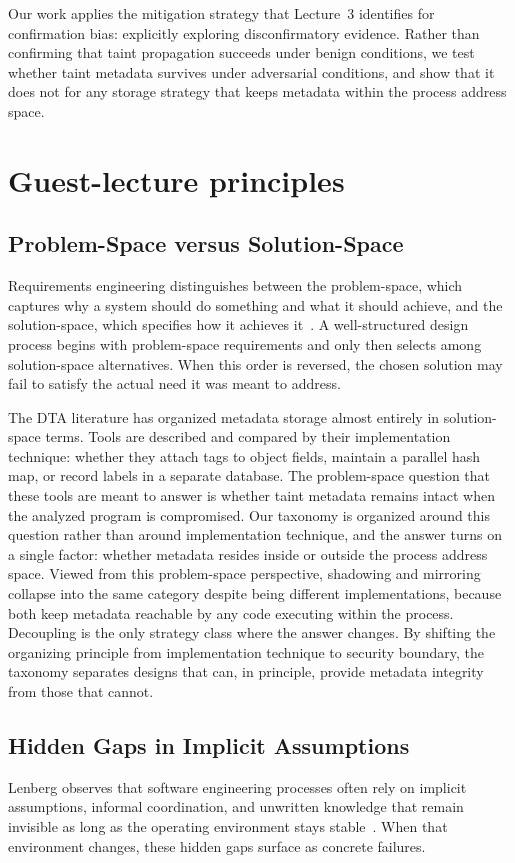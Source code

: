 \documentclass[a4paper,11pt]{article}
\theoremstyle{plain}
\begin{document}
Our work applies the mitigation strategy that Lecture~3 identifies for confirmation bias: explicitly exploring disconfirmatory evidence. Rather than confirming that taint propagation succeeds under benign conditions, we test whether taint metadata survives under adversarial conditions, and show that it does not for any storage strategy that keeps metadata within the process address space.

\section{Guest-lecture principles}
\subsection{Problem-Space versus Solution-Space}
Requirements engineering distinguishes between the problem-space, which captures why a system should do something and what it should achieve, and the solution-space, which specifies how it achieves it~\cite{frattini2026re}. A well-structured design process begins with problem-space requirements and only then selects among solution-space alternatives. When this order is reversed, the chosen solution may fail to satisfy the actual need it was meant to address.


The DTA literature has organized metadata storage almost entirely in solution-space terms. Tools are described and compared by their implementation technique: whether they attach tags to object fields, maintain a parallel hash map, or record labels in a separate database. The problem-space question that these tools are meant to answer is whether taint metadata remains intact when the analyzed program is compromised. Our taxonomy is organized around this question rather than around implementation technique, and the answer turns on a single factor: whether metadata resides inside or outside the process address space. Viewed from this problem-space perspective, shadowing and mirroring collapse into the same category despite being different implementations, because both keep metadata reachable by any code executing within the process. Decoupling is the only strategy class where the answer changes. By shifting the organizing principle from implementation technique to security boundary, the taxonomy separates designs that can, in principle, provide metadata integrity from those that cannot.


\subsection{Hidden Gaps in Implicit Assumptions}
Lenberg observes that software engineering processes often rely on implicit assumptions, informal coordination, and unwritten knowledge that remain invisible as long as the operating environment stays stable~\cite{lenberg2026bse}. When that environment changes, these hidden gaps surface as concrete failures.
\end{document}
